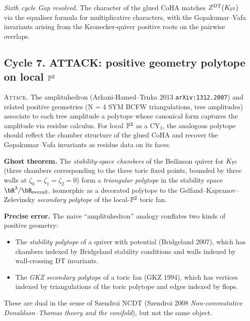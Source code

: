 \emph{Sixth cycle Gap resolved.} The character of the glued CoHA
matches $Z^{\mathrm{DT}}(K_{\mathbb{P}^2})$ via the equaliser formula for multiplicative
characters, with the Gopakumar--Vafa invariants arising from the
Kronecker-quiver positive roots on the pairwise overlaps.

\subsection*{Cycle 7. ATTACK: positive geometry polytope on local $\mathbb{P}^2$}

\textsc{Attack.} The amplituhedron (Arkani-Hamed--Trnka 2013
\texttt{arXiv:1312.2007}) and related positive geometries (N = 4 SYM
BCFW triangulations, tree amplitudes) associate to each tree amplitude
a polytope whose canonical form captures the amplitude via residue
calculus. For local $\mathbb{P}^2$ as a CY$_3$, the analogous polytope should
reflect the chamber structure of the glued CoHA and recover the
Gopakumar--Vafa invariants as residue data on its faces.

\textbf{Ghost theorem.} The \emph{stability-space chambers} of the
Beilinson quiver for $K_{\mathbb{P}^2}$ (three chambers corresponding to the
three toric fixed points, bounded by three walls at
$\zeta_0=\zeta_1=\zeta_2=0$) form a \emph{triangular polytope} in the
stability space $\bR^3/\bR_{\mathrm{overall}}$, isomorphic as a
decorated polytope to the Gelfand--Kapranov--Zelevinsky
\emph{secondary polytope} of the local-$\mathbb{P}^2$ toric fan.

\textbf{Precise error.} The naive ``amplituhedron'' analogy conflates
two kinds of positive geometry:
\begin{itemize}
\item The \emph{stability polytope} of a quiver with potential
(Bridgeland 2007), which has chambers indexed by Bridgeland stability
conditions and walls indexed by wall-crossing DT invariants.
\item The \emph{GKZ secondary polytope} of a toric fan (GKZ 1994), which
has vertices indexed by triangulations of the toric polytope and edges
indexed by flops.
\end{itemize}
These are dual in the sense of Szendroi NCDT (Szendroi 2008
\emph{Non-commutative Donaldson--Thomas theory and the conifold}), but
not the same object.

